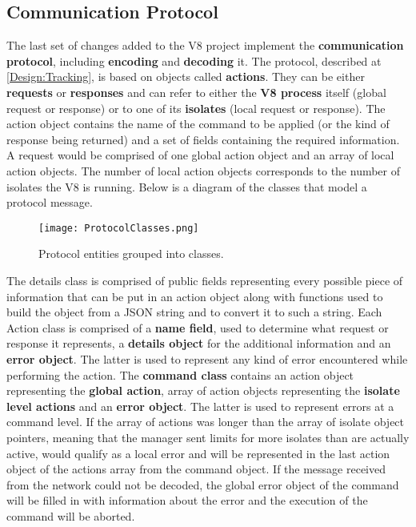 \documentclass{l4proj}
\begin{document}
\subsection{Communication Protocol}
\hspace*{3em} The last set of changes added to the V8 project implement the \textbf{communication protocol}, including \textbf{encoding} and \textbf{decoding} it. The protocol, described at \ref{Design:Tracking}, is based on objects called \textbf{actions}. They can be either \textbf{requests} or \textbf{responses} and can refer to either the \textbf{V8 process} itself (global request or response) or to one of its \textbf{isolates} (local request or response). The action object contains the name of the command to be applied (or the kind of response being returned) and a set of fields containing the required information. A request would be comprised of one global action object and an array of local action objects. The number of local action objects corresponds to the number of isolates the V8 is running. Below is a diagram of the classes that model a protocol message.     
\begin{figure}[!ht]
  \centering
    \texttt{[image: ProtocolClasses.png]}
	\caption{Protocol entities grouped into classes.}
\end{figure}
\hspace*{3em} The details class is comprised of public fields representing every possible piece of information that can be put in an action object along with functions used to build the object from a JSON string and to convert it to such a string. Each Action class is comprised of a \textbf{name field}, used to determine what request or response it represents, a \textbf{details object} for the additional information and an \textbf{error object}. The latter is used to represent any kind of error encountered while performing the action. The \textbf{command class} contains an action object representing the \textbf{global action}, array of action objects representing the \textbf{isolate level actions} and an \textbf{error object}. The latter is used to represent errors at a command level. If the array of actions was longer than the array of isolate object pointers, meaning that the manager sent limits for more isolates than are actually active, would qualify as a local error and will be represented in the last action object of the actions array from the command object. If the message received from the network could not be decoded, the global error object of the command will be filled in with information about the error and the execution of the command will be aborted.
\end{document}
